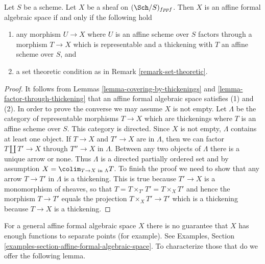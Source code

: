 \begin{lemma}
\label{lemma-characterize-affine-formal-algebraic-space}
Let $S$ be a scheme. Let $X$ be a sheaf on $(\Sch/S)_{fppf}$.
Then $X$ is an affine formal algebraic space if and only if
the following hold
\begin{enumerate}
\item any morphism $U \to X$ where $U$ is an affine scheme over $S$
factors through a morphism $T \to X$ which is representable and a
thickening with $T$ an affine scheme over $S$, and
\item a set theoretic condition as in Remark \ref{remark-set-theoretic}.
\end{enumerate}
\end{lemma}

\begin{proof}
It follows from Lemmas \ref{lemma-covering-by-thickenings} and
\ref{lemma-factor-through-thickening} that an affine formal algebraic space
satisfies (1) and (2). In order to prove the converse we may
assume $X$ is not empty.
Let $\Lambda$ be the category of representable morphisms $T \to X$ which are
thickenings where $T$ is an affine scheme over $S$. This category
is directed. Since $X$ is not empty, $\Lambda$ contains at least one
object. If $T \to X$ and $T' \to X$ are in $\Lambda$, then we can
factor $T \amalg T' \to X$ through $T'' \to X$ in $\Lambda$. Between
any two objects of $\Lambda$ there is a unique arrow or none. Thus
$\Lambda$ is a directed partially ordered set and by assumption
$X = \colim_{T \to X\text{ in }\Lambda} T$. To finish the proof
we need to show that any arrow $T \to T'$ in $\Lambda$ is a thickening.
This is true because $T' \to X$ is a monomorphism of sheaves, so that
$T = T \times_{T'} T' = T \times_X T'$ and hence the morphism
$T \to T'$ equals the projection $T \times_X T' \to T'$ which is
a thickening because $T \to X$ is a thickening.
\end{proof}

\noindent
For a general affine formal algebraic space $X$ there is no guarantee
that $X$ has enough functions to separate points (for example).
See Examples, Section \ref{examples-section-affine-formal-algebraic-space}.
To characterize those that do we offer the following lemma.


